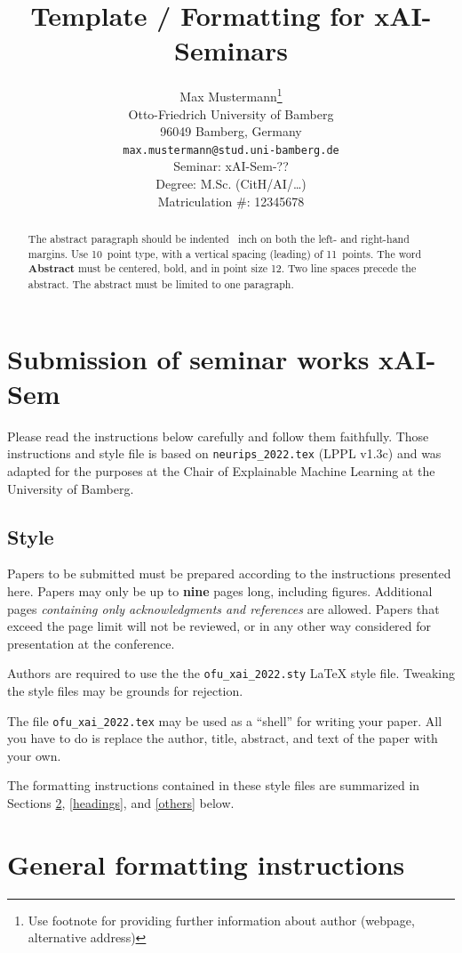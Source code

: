 \documentclass[a4paper]{article}
\title{Template / Formatting for xAI-Seminars}
\author{%
  Max Mustermann\thanks{Use footnote for providing further information
    about author (webpage, alternative address)} \\
  Otto-Friedrich University of Bamberg\\
  96049 Bamberg, Germany\\
  \texttt{max.mustermann@stud.uni-bamberg.de} \\[0.5cm]
  Seminar: xAI-Sem-?? \\
  Degree: M.Sc. (CitH/AI/\dots) \\
  Matriculation \#: 12345678
}
\begin{document}
\maketitle
\def\va{{\bm{a}}}

\begin{abstract}
  The abstract paragraph should be indented ~inch on
  both the left- and right-hand margins. Use 10~point type, with a vertical
  spacing (leading) of 11~points.  The word \textbf{Abstract} must be centered,
  bold, and in point size 12. Two line spaces precede the abstract. The abstract
  must be limited to one paragraph.
\end{abstract}


\section{Submission of seminar works xAI-Sem}


Please read the instructions below carefully and follow them faithfully. Those instructions and style file is based on \verb+neurips_2022.tex+ (LPPL v1.3c) and was adapted for the purposes at the Chair of Explainable Machine Learning at the University of Bamberg.


\subsection{Style}


Papers to be submitted must be prepared according to the
instructions presented here. Papers may only be up to {\bf nine} pages long,
including figures. Additional pages \emph{containing only acknowledgments and
references} are allowed. Papers that exceed the page limit will not be
reviewed, or in any other way considered for presentation at the conference.


Authors are required to use the the \verb+ofu_xai_2022.sty+ \LaTeX{} style file. Tweaking the style files may be grounds for rejection.

The file \verb+ofu_xai_2022.tex+ may be used as a ``shell'' for writing your
paper. All you have to do is replace the author, title, abstract, and text of
the paper with your own.


The formatting instructions contained in these style files are summarized in
Sections \ref{gen_inst}, \ref{headings}, and \ref{others} below.


\section{General formatting instructions}
\label{gen_inst}
\end{document}
